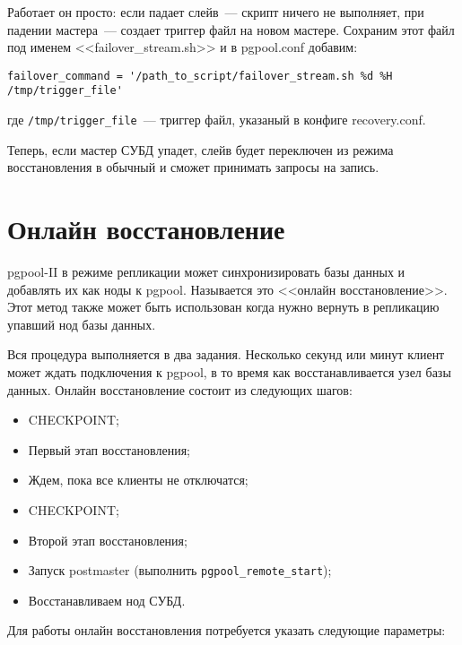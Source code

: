 Работает он просто: если падает слейв~--- скрипт ничего не выполняет, при падении мастера~--- создает триггер файл на новом мастере. Сохраним этот файл под именем <<failover\_stream.sh>> и в pgpool.conf добавим:

\begin{lstlisting}[label=lst:pgpool41,caption=Что выполнять при падении нода]
failover_command = '/path_to_script/failover_stream.sh %d %H /tmp/trigger_file'
\end{lstlisting}

где \lstinline!/tmp/trigger_file!~--- триггер файл, указаный в конфиге recovery.conf.

Теперь, если мастер СУБД упадет, слейв будет переключен из режима восстановления в обычный и сможет принимать запросы на запись.

\section{Онлайн восстановление}

pgpool-II в режиме репликации может синхронизировать базы данных и добавлять их как ноды к pgpool. Называется это <<онлайн восстановление>>. Этот метод также может быть использован когда нужно вернуть в репликацию упавший нод базы данных.

Вся процедура выполняется в два задания. Несколько секунд или минут клиент может ждать подключения к pgpool, в то время как восстанавливается узел базы данных. Онлайн восстановление состоит из следующих шагов:

\begin{itemize}
  \item CHECKPOINT;
  \item Первый этап восстановления;
  \item Ждем, пока все клиенты не отключатся;
  \item CHECKPOINT;
  \item Второй этап восстановления;
  \item Запуск postmaster (выполнить \lstinline!pgpool_remote_start!);
  \item Восстанавливаем нод СУБД.
\end{itemize}

Для работы онлайн восстановления потребуется указать следующие параметры:


